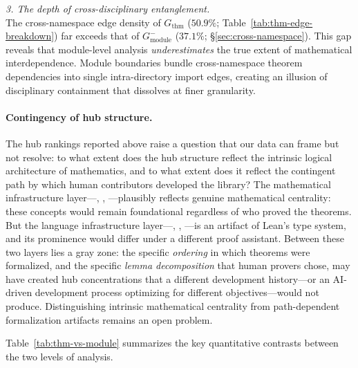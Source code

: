 \medskip
\noindent\textit{3. The depth of cross-disciplinary entanglement.}\\
The cross-namespace edge density of $G_{\mathrm{thm}}$ ($50.9\%$; Table~\ref{tab:thm-edge-breakdown}) far exceeds that of $G_{\mathrm{module}}^{-}$ ($37.1\%$; \S\ref{sec:cross-namespace}). This gap reveals that module-level analysis \emph{underestimates} the true extent of mathematical interdependence. Module boundaries bundle cross-namespace theorem dependencies into single intra-directory import edges, creating an illusion of disciplinary containment that dissolves at finer granularity.

\paragraph{Contingency of hub structure.}
The hub rankings reported above raise a question that our data can frame but not resolve: to what extent does the hub structure reflect the intrinsic logical architecture of mathematics, and to what extent does it reflect the contingent path by which human contributors developed the library? The mathematical infrastructure layer---, , ---plausibly reflects genuine mathematical centrality: these concepts would remain foundational regardless of who proved the theorems. But the language infrastructure layer---, , ---is an artifact of Lean's type system, and its prominence would differ under a different proof assistant. Between these two layers lies a gray zone: the specific \emph{ordering} in which theorems were formalized, and the specific \emph{lemma decomposition} that human provers chose, may have created hub concentrations that a different development history---or an AI-driven development process optimizing for different objectives---would not produce. Distinguishing intrinsic mathematical centrality from path-dependent formalization artifacts remains an open problem.

\medskip

Table~\ref{tab:thm-vs-module} summarizes the key quantitative contrasts between the two levels of analysis.

